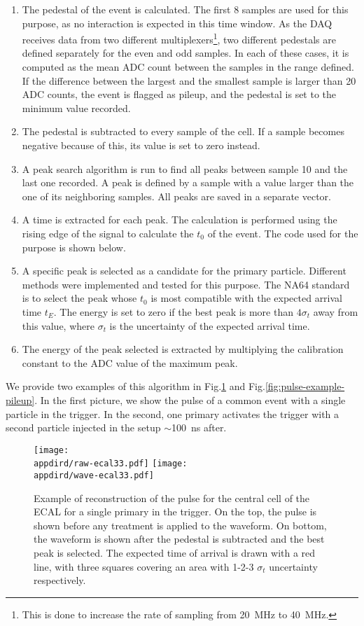 \begin{enumerate}
\item The pedestal of the event is calculated. The first 8 samples are used for this purpose, as no interaction is expected in this time window. As the DAQ receives data from two different multiplexers\footnote{This is done to increase the rate of sampling from \SI{20}{\mega\hertz} to \SI{40}{\mega\hertz}.}, two different pedestals are defined separately for the even and odd samples. In each of these cases, it is computed as the mean ADC count between the samples in the range defined. If the difference between the largest and the smallest sample is larger than 20 ADC counts, the event is flagged as pileup, and the pedestal is set to the minimum value recorded.
\item The pedestal is subtracted to every sample of the cell. If a sample becomes negative because of this, its value is set to zero instead.
\item A peak search algorithm is run to find all peaks between sample 10 and the last one recorded. A peak is defined by a sample with a value larger than the one of its neighboring samples. All peaks are saved in a separate vector.
\item A time is extracted for each peak. The calculation is performed using the rising edge of the signal to calculate the $t_0$ of the event. The code used for the purpose is shown below.
\item A specific peak is selected as a candidate for the primary particle. Different methods were implemented and tested for this purpose. The NA64 standard is to select the peak whose $t_0$ is most compatible with the expected arrival time $t_E$. The energy is set to zero if the best peak is more than $4\sigma_t$ away from this value, where $\sigma_t$ is the uncertainty of the expected arrival time.
\item The energy of the peak selected is extracted by multiplying the calibration constant to the ADC value of the maximum peak.
\end{enumerate}

We provide two examples of this algorithm in Fig.\ref{fig:pulse-example} and Fig.\ref{fig:pulse-example-pileup}. In the first picture, we show the pulse of a common event with a single particle in the trigger. In the second, one primary activates the trigger with a second particle injected in the setup $\sim$\SI{100}{\nano\second} after.

\begin{figure}[bth!]
  \centering
  \texttt{[image: \\appdird/raw-ecal33.pdf]}
  \texttt{[image: \\appdird/wave-ecal33.pdf]}
  \caption[example of pulse reconstruction in NA64]{Example of reconstruction of the pulse for the central cell of the ECAL for a single primary in the trigger. On the top, the pulse is shown before any treatment is applied to the waveform. On bottom, the waveform is shown after the pedestal is subtracted and the best peak is selected. The expected time of arrival is drawn with a red line, with three squares covering an area with 1-2-3 $\sigma_t$ uncertainty respectively.}
  \label{fig:pulse-example}
\end{figure}

